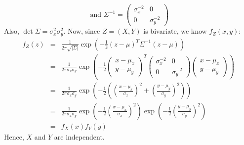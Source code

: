\[
    \textrm{ and } \Sigma^{-1} = \begin{pmatrix}
                                   \sigma_x^{-2} & 0   \\
                                   0          & \sigma_y^{-2}
                                 \end{pmatrix}
\]
Also, $\det\Sigma = \sigma_x^2 \sigma_y^2$. Now, since $Z=(X,Y)$ is bivariate, we know $f_Z(x,y)$:
\begin{eqnarray*}
    f_Z(z) &=& \frac{1}{2\pi\sqrt{|\Sigma|}} \exp\left(-\frac{1}{2}(z-\mu)^T\Sigma^{-1}(z-\mu)\right)\\
           &=& \frac{1}{2\pi\sigma_x \sigma_y} \exp\left(-\frac{1}{2} \begin{pmatrix}x-\mu_x \\ y-\mu_y\end{pmatrix}^T \begin{pmatrix}\sigma_x^{-2} & 0 \\ 0 & \sigma_y^{-2}\end{pmatrix}\begin{pmatrix}x-\mu_x \\ y-\mu_y\end{pmatrix}\right) \\
           &=& \frac{1}{2\pi\sigma_x \sigma_y} \exp\left(-\frac{1}{2} \left(\left(\frac{x-\mu_x}{\sigma_x}\right)^2 + \left(\frac{y-\mu_y}{\sigma_y}\right)^2\right)\right) \\
           &=& \frac{1}{2\pi\sigma_x \sigma_y} \exp\left(-\frac{1}{2} \left(\frac{x-\mu_x}{\sigma_x}\right)^2 \right)\exp \left( -\frac{1}{2}\left(\frac{y-\mu_y}{\sigma_y}\right)^2\right) \\
           &=& f_X(x)f_Y(y) 
\end{eqnarray*}
Hence, $X$ and $Y$ are independent.
